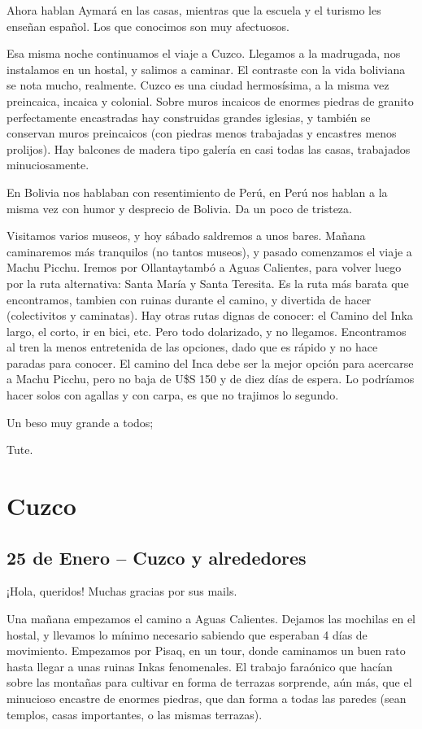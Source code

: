 Ahora hablan Aymará en las casas, mientras que la escuela y el turismo les
enseñan español. Los que conocimos son muy afectuosos.

Esa misma noche continuamos el viaje a Cuzco. Llegamos a la madrugada, nos
instalamos en un hostal, y salimos a caminar. El contraste con la vida boliviana
se nota mucho, realmente. Cuzco es una ciudad hermosísima, a la misma vez
preincaica, incaica y colonial. Sobre muros incaicos de enormes piedras de
granito perfectamente encastradas hay construidas grandes iglesias, y también
se conservan muros preincaicos (con piedras menos trabajadas y encastres menos
prolijos). Hay balcones de madera tipo galería en casi todas las casas,
trabajados minuciosamente.

En Bolivia nos hablaban con resentimiento de Perú, en Perú nos hablan a la
misma vez con humor y desprecio de Bolivia. Da un poco de tristeza.

Visitamos varios museos, y hoy sábado saldremos a unos bares. Mañana
caminaremos más tranquilos (no tantos museos), y pasado comenzamos el viaje a
Machu Picchu. Iremos por Ollantaytambó a Aguas Calientes, para volver luego por
la ruta alternativa: Santa María y Santa Teresita. Es la ruta más barata
que encontramos, tambien con ruinas durante el camino, y divertida de hacer
(colectivitos y caminatas). Hay otras rutas dignas de conocer: el Camino del
Inka largo, el corto, ir en bici, etc. Pero todo dolarizado, y no llegamos.
Encontramos al tren la menos entretenida de las opciones, dado que es rápido y
no hace paradas para conocer. El camino del Inca debe ser la mejor opción para
acercarse a Machu Picchu, pero no baja de U\$S 150 y de diez días de espera. Lo
podríamos hacer solos con agallas y con carpa, es que no trajimos lo segundo.

Un beso muy grande a todos;

Tute.


\section{Cuzco}

\subsection*{25 de Enero -- Cuzco y alrededores}

¡Hola, queridos! Muchas gracias por sus mails.

Una mañana empezamos el camino a Aguas Calientes. Dejamos las mochilas en el
hostal, y llevamos lo mínimo necesario sabiendo que esperaban 4 días de
movimiento. Empezamos por Pisaq, en un tour, donde caminamos un buen rato hasta
llegar a unas ruinas Inkas fenomenales. El trabajo faraónico que hacían sobre
las montañas para cultivar en forma de terrazas sorprende, aún más, que el
minucioso encastre de enormes piedras, que dan forma a todas las paredes (sean
templos, casas importantes, o las mismas terrazas).

